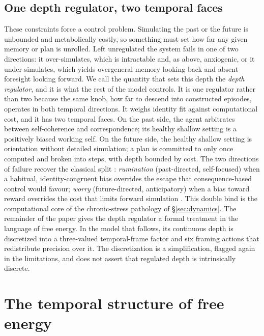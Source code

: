 \documentclass[11pt,a4paper]{article}
\begin{document}
\subsection{One depth regulator, two temporal faces}\label{sec:regulator}
These constraints force a control problem. Simulating the past or the future is
unbounded and metabolically costly, so something must set how far any given memory or
plan is unrolled. Left unregulated the system fails in one of two directions: it
over-simulates, which is intractable and, as above, anxiogenic, or it under-simulates,
which yields overgeneral memory looking back and absent foresight looking forward. We
call the quantity that sets this depth the \emph{depth regulator}, and it is what the
rest of the model controls. It is one regulator rather than two because the same knob,
how far to descend into constructed episodes, operates in both temporal directions. It
weighs identity fit against computational cost, and it has two temporal faces. On the past side, the agent arbitrates between
self-coherence and correspondence; its healthy shallow setting is a positively biased
working self. On the future side, the healthy shallow setting is orientation without
detailed simulation; a plan is committed to only once computed and broken into steps,
with depth bounded by cost. The two directions of failure recover the classical split
\citep{nolenhoeksema2008rethinking}: \emph{rumination} (past-directed, self-focused)
when a habitual, identity-congruent bias overrides the escape that consequence-based
control would favour; \emph{worry} (future-directed, anticipatory) when a bias toward
reward overrides the cost that limits forward simulation \citep{ehring2008repetitive}.
This double bind is the computational core of the chronic-stress pathology of
\S\ref{sec:dynamics}. The remainder of the paper gives the depth regulator a formal
treatment in the language of free energy. In the model that follows, its continuous
depth is discretized into a three-valued temporal-frame factor and six framing actions
that redistribute precision over it. The discretization is a simplification, flagged
again in the limitations, and does not assert that regulated depth is intrinsically
discrete.

\section{The temporal structure of free energy}\label{sec:free-energy}
\end{document}
